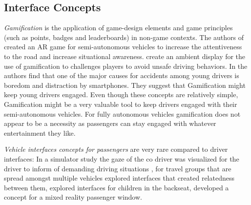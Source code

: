 \subsection{Interface Concepts}
\emph{Gamification} is the application of game-design elements and game principles (such as points, badges and leaderboards) in non-game contexts.
The authors of \cite{Schroeter2016} created an AR game for semi-autonomous vehicles to increase the attentiveness to the road and increase situational awareness.\cite{Rodriguez2014} create an ambient display for the use of gamification to challenges players to avoid unsafe driving behaviors.  In \cite{Schroeter} the authors find that one of the major causes for accidents among young drivers is boredom and distraction by smartphones. They suggest that Gamification might keep young drivers engaged. Even though these  concepts are relatively simple, Gamification might be a very valuable tool to keep drivers engaged with their semi-autonomous vehicles. For fully autonomous vehicles gamification does not appear to be a necessity as passengers can stay engaged with whatever entertainment they like. 

\emph{Vehicle interfaces concepts for passengers} are very rare compared to driver interfaces: In a simulator study the gaze of the co driver was visualized for the driver to inform of demanding driving situations \cite{Trosterer}, for travel groups that are spread amongst multiple vehicles \cite{Knobel2012} explored interfaces that created relatedness between them, \cite{Wilfinger2011} explored interfaces for children in the backseat, \cite{Hakkila2014} developed a concept for a mixed reality passenger window. 

  

